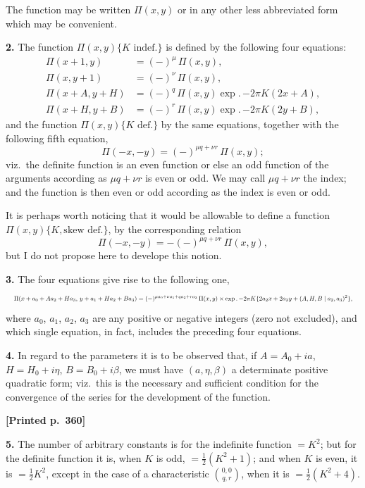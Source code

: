 \documentclass[11pt]{article}
\begin{document}
The function may be written $\Pi(x,y)$ or in any other less abbreviated form which may be convenient.

\medskip
\noindent\textbf{2.} The function $\Pi(x,y)\{K\text{ indef.}\}$ is defined by the following four equations:
\begin{align*}
\Pi(x+1,y) &= (-)^{\mu}\,\Pi(x,y),\\
\Pi(x,y+1) &= (-)^{\nu}\,\Pi(x,y),\\
\Pi(x+A,y+H) &= (-)^{q}\,\Pi(x,y)\exp.\,{-2\pi K}(2x+A),\\
\Pi(x+H,y+B) &= (-)^{r}\,\Pi(x,y)\exp.\,{-2\pi K}(2y+B),
\end{align*}
and the function $\Pi(x,y)\{K\text{ def.}\}$ by the same equations, together with the following fifth equation,
\[
\Pi(-x,-y) = (-)^{\mu q+\nu r}\,\Pi(x,y);
\]
viz.\ the definite function is an even function or else an odd function of the arguments according as $\mu q+\nu r$ is even or odd. We may call $\mu q+\nu r$ the index; and the function is then even or odd according as the index is even or odd.

It is perhaps worth noticing that it would be allowable to define a function $\Pi(x,y)\{K,\text{skew def.}\}$, by the corresponding relation
\[
\Pi(-x,-y) = -(-)^{\mu q+\nu r}\,\Pi(x,y),
\]
but I do not propose here to develope this notion.

\medskip
\noindent\textbf{3.} The four equations give rise to the following one,
\[
\resizebox{\textwidth}{!}{$\displaystyle
\Pi(x+a_{0}+Aa_{2}+Ha_{3},\,y+a_{1}+Ha_{2}+Ba_{3})
=(-)^{\mu a_{0}+\nu a_{1}+q a_{2}+r a_{3}}\,\Pi(x,y)\times\exp.\,{-2\pi K}\{2a_{2}x+2a_{3}y+(A,H,B \mid a_{2},a_{3})^{2}\},
$}
\]
where $a_{0}$, $a_{1}$, $a_{2}$, $a_{3}$ are any positive or negative integers (zero not excluded), and which single equation, in fact, includes the preceding four equations.

\medskip
\noindent\textbf{4.} In regard to the parameters it is to be observed that, if $A=A_{0}+ia$, $H=H_{0}+i\eta$, $B=B_{0}+i\beta$, we must have $(a,\eta,\beta)$ a determinate positive quadratic form; viz.\ this is the necessary and sufficient condition for the convergence of the series for the development of the function.

\medskip
\noindent\textbf{[Printed p.~360]}\hfill

\medskip
\noindent\textbf{5.} The number of arbitrary constants is for the indefinite function $=K^{2}$; but for the definite function it is, when $K$ is odd, $=\tfrac{1}{2}(K^{2}+1)$; and when $K$ is even, it is $=\tfrac{1}{2}K^{2}$, except in the case of a characteristic $\binom{0,0}{q,r}$, when it is $=\tfrac{1}{2}(K^{2}+4)$.
\end{document}
